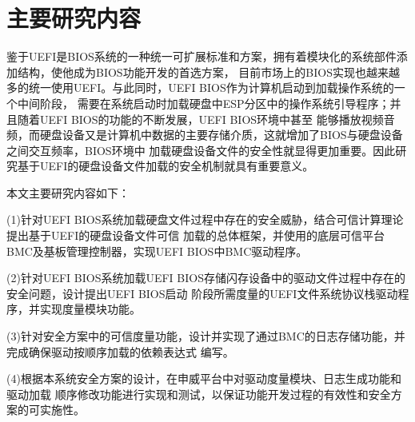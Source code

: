 \section{主要研究内容}
鉴于UEFI是BIOS系统的一种统一可扩展标准和方案，拥有着模块化的系统部件添加结构，使他成为BIOS功能开发的首选方案，
目前市场上的BIOS实现也越来越多的统一使用UEFI。与此同时，UEFI BIOS作为计算机启动到加载操作系统的一个中间阶段，
需要在系统启动时加载硬盘中ESP分区中的操作系统引导程序；并且随着UEFI BIOS的功能的不断发展，UEFI BIOS环境中甚至
能够播放视频音频，而硬盘设备又是计算机中数据的主要存储介质，这就增加了BIOS与硬盘设备之间交互频率\cite{chinese10}，BIOS环境中
加载硬盘设备文件的安全性就显得更加重要。因此研究基于UEFI的硬盘设备文件加载的安全机制就具有重要意义。
\par 本文主要研究内容如下：
\par (1)针对UEFI BIOS系统加载硬盘文件过程中存在的安全威胁，结合可信计算理论提出基于UEFI的硬盘设备文件可信
加载的总体框架，并使用的底层可信平台BMC及基板管理控制器，实现UEFI BIOS中BMC驱动程序。
\par (2)针对UEFI BIOS系统加载UEFI BIOS存储闪存设备中的驱动文件过程中存在的安全问题，设计提出UEFI BIOS启动
阶段所需度量的UEFI文件系统协议栈驱动程序，并实现度量模块功能。
\par (3)针对安全方案中的可信度量功能，设计并实现了通过BMC的日志存储功能，并完成确保驱动按顺序加载的依赖表达式
编写。
\par (4)根据本系统安全方案的设计，在申威平台中对驱动度量模块、日志生成功能和驱动加载
顺序修改功能进行实现和测试，以保证功能开发过程的有效性和安全方案的可实施性。

